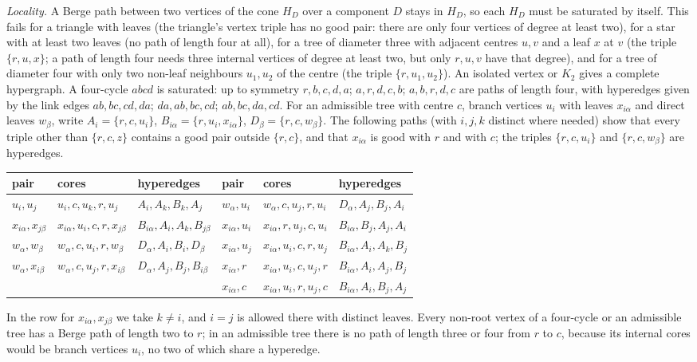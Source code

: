 \documentclass[11pt]{article}
\theoremstyle{remark}
\begin{document}
\emph{Locality.} A Berge path between two vertices of the cone $H_D$ over
a component $D$ stays in $H_D$, so each $H_D$ must be saturated by itself.
This fails for a triangle with leaves (the triangle's vertex triple has no
good pair: there are only four vertices of degree at least two), for a
star with at least two leaves (no path of length four at all), for a tree
of diameter three with adjacent centres $u,v$ and a leaf $x$ at $v$ (the
triple $\{r,u,x\}$; a path of length four needs three internal vertices
of degree at least two, but only $r,u,v$ have that degree), and for a tree
of diameter four with only two non-leaf neighbours $u_1,u_2$ of the centre
(the triple $\{r,u_1,u_2\}$). An isolated vertex or $K_2$ gives a complete
hypergraph. A four-cycle $abcd$ is saturated: up to symmetry
$r,b,c,d,a$; $a,r,d,c,b$; $a,b,r,d,c$ are paths of length four, with
hyperedges given by the link edges $ab,bc,cd,da$; $da,ab,bc,cd$;
$ab,bc,da,cd$. For an admissible tree with centre $c$, branch vertices
$u_i$ with leaves $x_{i\alpha}$ and direct leaves $w_\beta$, write
$A_i=\{r,c,u_i\}$, $B_{i\alpha}=\{r,u_i,x_{i\alpha}\}$, $D_\beta=\{r,c,w_\beta\}$.
The following paths (with $i,j,k$ distinct where needed) show that every
triple other than $\{r,c,z\}$ contains a good pair outside $\{r,c\}$, and
that $x_{i\alpha}$ is good with $r$ and with $c$; the triples $\{r,c,u_i\}$
and $\{r,c,w_\beta\}$ are hyperedges.
\begin{center}\small
\begin{tabular}{lll@{\qquad}lll}
\toprule
pair & cores & hyperedges & pair & cores & hyperedges\\
\midrule
$u_i,u_j$ & $u_i,c,u_k,r,u_j$ & $A_i,A_k,B_k,A_j$ & $w_\alpha,u_i$ & $w_\alpha,c,u_j,r,u_i$ & $D_\alpha,A_j,B_j,A_i$\\
$x_{i\alpha},x_{j\beta}$ & $x_{i\alpha},u_i,c,r,x_{j\beta}$ & $B_{i\alpha},A_i,A_k,B_{j\beta}$ & $x_{i\alpha},u_i$ & $x_{i\alpha},r,u_j,c,u_i$ & $B_{i\alpha},B_j,A_j,A_i$\\
$w_\alpha,w_\beta$ & $w_\alpha,c,u_i,r,w_\beta$ & $D_\alpha,A_i,B_i,D_\beta$ & $x_{i\alpha},u_j$ & $x_{i\alpha},u_i,c,r,u_j$ & $B_{i\alpha},A_i,A_k,B_j$\\
$w_\alpha,x_{i\beta}$ & $w_\alpha,c,u_j,r,x_{i\beta}$ & $D_\alpha,A_j,B_j,B_{i\beta}$ & $x_{i\alpha},r$ & $x_{i\alpha},u_i,c,u_j,r$ & $B_{i\alpha},A_i,A_j,B_j$\\
 & & & $x_{i\alpha},c$ & $x_{i\alpha},u_i,r,u_j,c$ & $B_{i\alpha},A_i,B_j,A_j$\\
\bottomrule
\end{tabular}
\end{center}
In the row for $x_{i\alpha},x_{j\beta}$ we take $k\ne i$, and $i=j$ is
allowed there with distinct leaves. Every non-root vertex of a four-cycle or an
admissible tree has a Berge path of length two to $r$; in an admissible
tree there is no path of length three or four from $r$ to $c$, because its
internal cores would be branch vertices $u_i$, no two of which share a
hyperedge.
\end{document}
